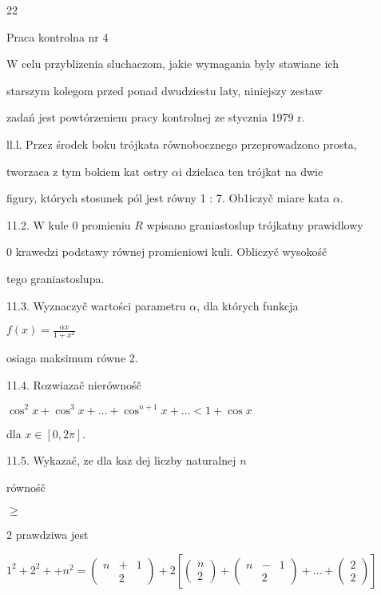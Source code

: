 \documentclass[a4paper,12pt]{article}
\begin{document}
22

Praca kontrolna nr 4

$\mathrm{W}$ celu przyblizenia sluchaczom, jakie wymagania byly stawiane ich

starszym kolegom przed ponad dwudziestu laty, niniejszy zestaw

zadań jest powtórzeniem pracy kontrolnej ze stycznia 1979 $\mathrm{r}.$

ll.l. Przez środek boku trójkata równobocznego przeprowadzono prosta,

tworzaca $\mathrm{z}$ tym bokiem $\mathrm{k}\mathrm{a}\mathrm{t}$ ostry $\alpha \mathrm{i}$ dzielaca ten trójkat na dwie

figury, których stosunek pól jest równy 1 : 7. Ob1iczyč miare kata $\alpha.$

11.2. $\mathrm{W}$ kule $0$ promieniu $R$ wpisano graniastoslup trójkatny prawidlowy

$0$ krawedzi podstawy równej promieniowi kuli. Obliczyč wysokośč

tego graniastoslupa.

11.3. Wyznaczyč wartości parametru $\alpha$, dla których funkcja

$f(x)=\displaystyle \frac{\alpha x}{1+x^{2}}$

osiaga maksimum równe 2.

11.4. Rozwiazač nierównośč

$\cos^{2}x+\cos^{3}x+\ldots+\cos^{n+1}x+\ldots<1+\cos x$

dla $x\in[0,2\pi].$

11.5. Wykazač, $\dot{\mathrm{z}}\mathrm{e}$ dla $\mathrm{k}\mathrm{a}\dot{\mathrm{z}}$ dej liczby naturalnej $n$

równośč

$\geq$

2 prawdziwa jest

$1^{2}+2^{2}++n^{2}=\left(\begin{array}{lll}
n & + & 1\\
 & 2 & 
\end{array}\right)+2[\left(\begin{array}{l}
n\\
2
\end{array}\right)+\left(\begin{array}{lll}
n & - & 1\\
 & 2 & 
\end{array}\right)+\ldots+\left(\begin{array}{l}
2\\
2
\end{array}\right)]$
\end{document}

